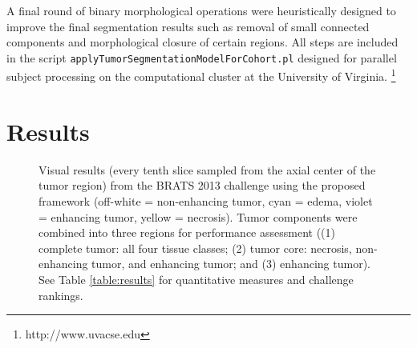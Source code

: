 \documentclass[preprint,authoryear,review,12pt]{elsarticle}
\begin{document}
A final round of binary morphological operations were heuristically designed
to improve the final segmentation results such as removal of small connected 
components and morphological closure of certain regions.
All steps are included in the script 
{\tt applyTumorSegmentationModelForCohort.pl} designed for parallel subject 
processing on the computational cluster at the University of Virginia.%
\footnote{
http://www.uvacse.edu
}




%
%

\section{Results}


\begin{figure}
  \vspace{-20mm}
  \caption{Visual results (every tenth slice sampled from the axial center of the
  tumor region) from the BRATS 2013 challenge using the proposed
  framework (off-white = non-enhancing tumor, cyan = edema, violet = enhancing 
  tumor, yellow = necrosis).  Tumor components were combined into
  three regions for performance assessment ((1) complete tumor: all four tissue
  classes; (2) tumor core:  necrosis, non-enhancing tumor, and enhancing tumor;
  and (3) enhancing tumor).  See Table \ref{table:results} for quantitative measures
  and challenge rankings.
  }
  \label{fig:challengeresults}
\end{figure}
\end{document}
